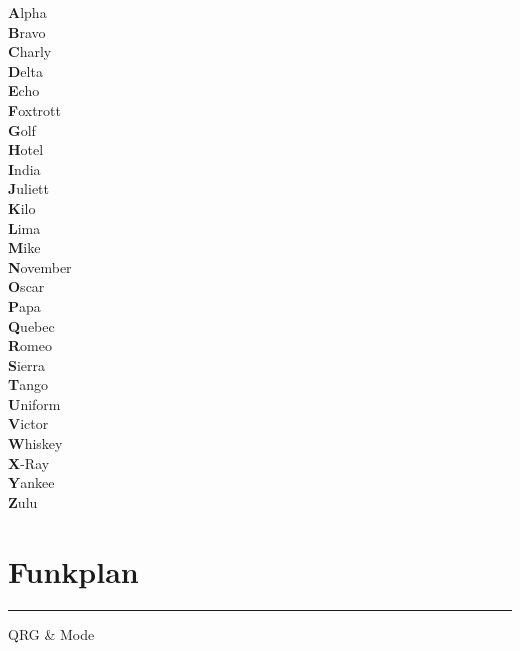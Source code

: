\documentclass[a4paper,10pt]{article}
\begin{document}
\vspace{-1cm}

\textbf{A}lpha\\
\textbf{B}ravo\\
\textbf{C}harly\\
\textbf{D}elta\\
\textbf{E}cho\\
\textbf{F}oxtrott\\
\textbf{G}olf\\
\textbf{H}otel\\
\textbf{I}ndia\\
\textbf{J}uliett\\
\textbf{K}ilo\\
\textbf{L}ima\\
\textbf{M}ike\\
\textbf{N}ovember\\
\textbf{O}scar\\
\textbf{P}apa\\
\textbf{Q}uebec\\
\textbf{R}omeo\\
\textbf{S}ierra\\
\textbf{T}ango\\
\textbf{U}niform\\
\textbf{V}ictor\\
\textbf{W}hiskey\\
\textbf{X}-Ray\\
\textbf{Y}ankee\\
\textbf{Z}ulu\\

\clearpage

\section{Funkplan}

    \bigskip
    \hspace{8cm}
    \begin{minipage}[t]{0.33\textwidth}
        \centering
        \hrule
        \vspace{0.5ex}
        \small QRG \& Mode
    \end{minipage}
\end{document}
